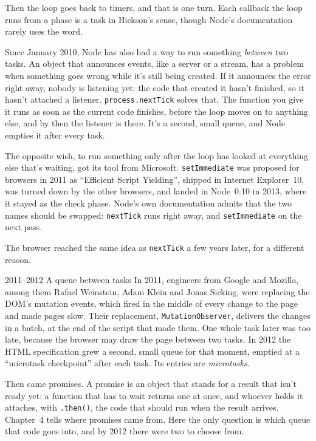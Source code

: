Then the loop goes back to timers, and that is one turn. Each callback the loop
runs from a phase is a task in Hickson's sense, though Node's documentation
rarely uses the word.

Since January 2010, Node has also had a way to run something \emph{between}
two tasks. An object that announces events, like a server or a stream, has a
problem when something goes wrong while it's still being created. If it
announces the error right away, nobody is listening yet: the code that created
it hasn't finished, so it hasn't attached a listener. \texttt{process.nextTick}
solves that. The function you give it runs as soon as the current code
finishes, before the loop moves on to anything else, and by then the listener
is there. It's a second, small queue, and Node empties it after every task.

The opposite wish, to run something only after the loop has looked at
everything else that's waiting, got its tool from Microsoft. \texttt{setImmediate}
was proposed for browsers in 2011 as ``Efficient Script Yielding'', shipped in
Internet Explorer~10, was turned down by the other browsers, and landed in
Node~0.10 in 2013, where it stayed as the check phase. Node's own documentation
admits that the two names should be swapped: \texttt{nextTick} runs right away,
and \texttt{setImmediate} on the next pass.

The browser reached the same idea as \texttt{nextTick} a few years later, for a
different reason.

\begin{history}{2011--2012 \textperiodcentered{} A queue between tasks}
In 2011, engineers from Google and Mozilla, among them Rafael Weinstein, Adam
Klein and Jonas Sicking, were replacing the DOM's mutation events, which fired
in the middle of every change to the page and made pages slow. Their
replacement, \texttt{MutationObserver}, delivers the changes in a batch, at the
end of the script that made them. One whole task later was too late, because
the browser may draw the page between two tasks. In 2012 the HTML specification
grew a second, small queue for that moment, emptied at a ``microtask
checkpoint'' after each task. Its entries are \emph{microtasks}.
\end{history}

Then came promises. A promise is an object that stands for a result that isn't
ready yet: a function that has to wait returns one at once, and whoever holds it
attaches, with \texttt{.then()}, the code that should run when the result
arrives. Chapter~4 tells where promises came from. Here the only question is
which queue that code goes into, and by 2012 there were two to choose from.

